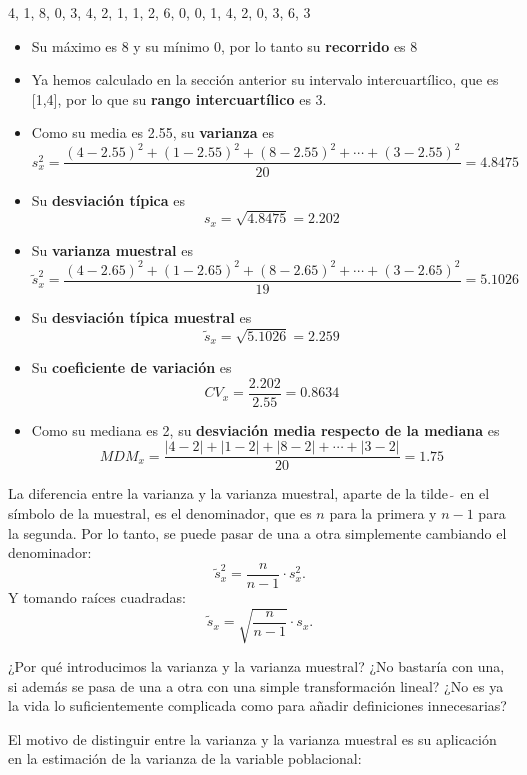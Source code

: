 \documentclass[
]{book}
\theoremstyle{definition}
\theoremstyle{definition}
\theoremstyle{definition}
\theoremstyle{definition}
\theoremstyle{remark}
\begin{document}
4, 1, 8, 0, 3, 4, 2, 1, 1, 2, 6, 0, 0, 1, 4, 2, 0, 3, 6, 3

\begin{itemize}
\item
  Su máximo es 8 y su mínimo 0, por lo tanto su \textbf{recorrido} es 8
\item
  Ya hemos calculado en la sección anterior su intervalo intercuartílico, que es {[}1,4{]}, por lo que su \textbf{rango intercuartílico} es 3.
\item
  Como su media es 2.55, su \textbf{varianza} es
  \[
  s^2_x=\frac{(4-2.55)^2+(1-2.55)^2+(8-2.55)^2+\cdots+(3-2.55)^2}{20}=4.8475
  \]
\item
  Su \textbf{desviación típica} es
  \[
  s_x=\sqrt{4.8475}=2.202
  \]
\item
  Su \textbf{varianza muestral} es
  \[
  \widetilde{s}^2_x=\frac{(4-2.65)^2+(1-2.65)^2+(8-2.65)^2+\cdots+(3-2.65)^2}{19}=5.1026
  \]
\item
  Su \textbf{desviación típica muestral} es
  \[
  \widetilde{s}_x=\sqrt{5.1026}=2.259
  \]
\item
  Su \textbf{coeficiente de variación} es
  \[
  CV_x=\frac{2.202}{2.55}=0.8634
  \]
\item
  Como su mediana es 2, su \textbf{desviación media respecto de la mediana} es
  \[
  MDM_x=\frac{|4-2|+|1-2|+|8-2|+\cdots+|3-2|}{20}=1.75
  \]
\end{itemize}

\begin{rmdnote}
La diferencia entre la varianza y la varianza muestral, aparte de la tilde \(\widetilde{\ }\) en el símbolo de la muestral, es el denominador, que es \(n\) para la primera y \(n-1\) para la segunda. Por lo tanto, se puede pasar de una a otra simplemente cambiando el denominador:
\[
\widetilde{s}^2_x=\frac{n}{n-1}\cdot s^2_x.
\]
Y tomando raíces cuadradas:
\[
\widetilde{s}_x=\sqrt{\frac{n}{n-1}}\cdot s_x.
\]
\end{rmdnote}

\begin{rmdromans}
¿Por qué introducimos la varianza y la varianza muestral? ¿No bastaría con una, si además se pasa de una a otra con una simple transformación lineal? ¿No es ya la vida lo suficientemente complicada como para añadir definiciones innecesarias?
\end{rmdromans}

El motivo de distinguir entre la varianza y la varianza muestral es su aplicación en la estimación de la varianza de la variable poblacional:
\end{document}
